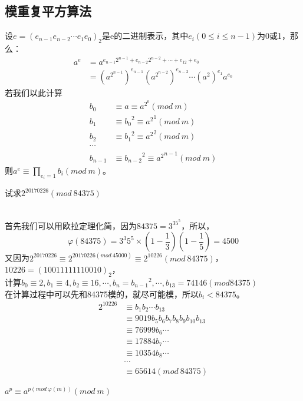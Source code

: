 \documentclass[cn,10pt]{elegantbook}
\begin{document}
\subsection{模重复平方算法}
 设$e = (e_{n-1}e_{n-2} \cdots e_1e_0)_2$是e的二进制表示，其中$e_i(0 \leq i \leq n-1)$为0或1，那么：
  \begin{align*}
   a^e &= a^{e_{n-1}2^{n-1}+e_{n-2}2^{n-2}+ \cdots + e_12+e_0} 
   \\ &= (a^{2^{n-1}})^{e_{n-1}} (a^{2^{n-2}})^{e_{n-2}} \cdots (a^2)^{e_1}a^{e_0}
  \end{align*}
 若我们以此计算
 \begin{align*}
  b_0 &\equiv a \equiv a^{2^0}(mod \ m)
  \\b_1 &\equiv {b_0}^2 \equiv {a^2}^1 (mod \ m)
  \\b_2 &\equiv {b_1}^2 \equiv {a^2}^2 (mod \ m)
  \\ \cdots
  \\b_{n-1} &\equiv {b_{n-2}}^2 \equiv {a^2}^{n-1} (mod \ m)
 \end{align*}
则$a^e \equiv \prod_{e_i =1}b_i(mod\ m)$。
\vskip 0.5cm
\begin{example}
  试求$2^{20170226}(mod\ 84375)$
\end{example}
\begin{solution}
  \\ 首先我们可以用欧拉定理化简，因为$84375 = 3^35^5$，所以，
  \begin{equation*}
    \varphi(84375) = 3^3 5^5 \times (1- \frac{1}{3})(1- \frac{1}{5}) = 4500
  \end{equation*}
  又因为$2^{20170226} \equiv 2^{20170226(mod\ 45000)} \equiv 2^{10226}(mod\ 84375)$，$10226 = (10011111110010)_2$，
  \\计算$b_0 \equiv 2,b_1 \equiv 4, b_2 \equiv 16 , \cdots , b_n = {b_{n-1}}^2, \cdots ,b_13 = 74146(mod 84375)$
  \\在计算过程中可以先和84375模的，就尽可能模，所以$b_i <84375$。
  \begin{align*}
    2^{10226} & \equiv b_1b_2 \cdots b_{13}
    \\ & \equiv 9019b_5b_6b_7b_8b_9b_{10}b_{13}
    \\ & \equiv 76999b_6 \cdots
    \\ & \equiv 17884b_7 \cdots
    \\ & \equiv 10354b_8 \cdots
    \\ & \cdots
    \\ & \equiv 65614(mod\ 84375)
  \end{align*}
\end{solution}
\vskip 0.5cm
\begin{note}
  $a^p \equiv a^{p(mod\ \varphi(m))}(mod\ m)$
\end{note}
\end{document}

